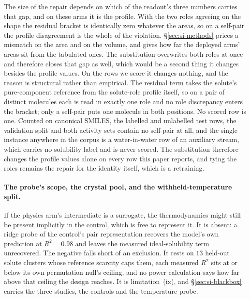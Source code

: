 The size of the repair depends on which of the readout's three numbers carries that gap, and on
these arms it is the profile. With the two roles agreeing on the shape the residual bracket is identically
zero whatever the areas, so on a self-pair the profile disagreement is the whole of the violation.
\S\ref{sec:si-methods} prices a mismatch on the area and on the volume, and gives how far the
deployed arms' areas sit from the tabulated ones. The substitution overwrites both roles at once and therefore closes that gap as well, which would
be a second thing it changes besides the profile values. On the rows we score it changes nothing,
and the reason is structural rather than empirical. The residual term takes the solute's
pure-component reference from the solute-role profile itself, so on a pair of distinct molecules
each is read in exactly one role and no role discrepancy enters the bracket; only a self-pair puts
one molecule in both positions. No scored row is one. Counted on canonical SMILES, the labelled and
unlabelled test rows, the validation split and both activity sets contain no self-pair at all, and
the single instance anywhere in the corpus is a water-in-water row of an auxiliary stream, which
carries no solubility label and is never scored. The substitution therefore changes the profile
values alone on every row this paper reports, and tying the roles remains the repair for the
identity itself, which is a retraining.

\paragraph{The probe's scope, the crystal pool, and the withheld-temperature split.}
If the physics arm's intermediate is a
surrogate, the thermodynamics might still be present implicitly in the control, which is free to
represent it. It is absent: a ridge probe of the control's pair representation recovers the model's
own prediction at $R^{2}=0.98$ and leaves the measured ideal-solubility term unrecovered. The
negative falls short of an exclusion. It rests on $13$ held-out solute clusters whose reference
scarcity caps them, each measured $R^{2}$ sits at or below its own permutation null's ceiling, and
no power calculation says how far above that ceiling the design reaches. It is limitation~(ix), and
\S\ref{sec:si-blackbox} carries the three studies, the controls and the temperature probe.

